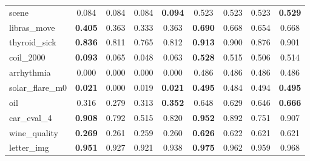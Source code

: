 \begin{figure}[ht]
\begin{tabular}{p{22mm}|*4{p{14mm}}|*4{p{14mm}}}
        scene&\multicolumn{1}{c}{0.084}&\multicolumn{1}{c}{0.084}&\multicolumn{1}{c}{0.084}&\multicolumn{1}{c|}{\textbf{0.094}}&\multicolumn{1}{c}{0.523}&\multicolumn{1}{c}{0.523}&\multicolumn{1}{c}{0.523}&\multicolumn{1}{c}{\textbf{0.529}}\\
        libras\_move&\multicolumn{1}{c}{\textbf{0.405}}&\multicolumn{1}{c}{0.363}&\multicolumn{1}{c}{0.333}&\multicolumn{1}{c|}{0.363}&\multicolumn{1}{c}{\textbf{0.690}}&\multicolumn{1}{c}{0.668}&\multicolumn{1}{c}{0.654}&\multicolumn{1}{c}{0.668}\\
        thyroid\_sick&\multicolumn{1}{c}{\textbf{0.836}}&\multicolumn{1}{c}{0.811}&\multicolumn{1}{c}{0.765}&\multicolumn{1}{c|}{0.812}&\multicolumn{1}{c}{\textbf{0.913}}&\multicolumn{1}{c}{0.900}&\multicolumn{1}{c}{0.876}&\multicolumn{1}{c}{0.901}\\
        coil\_2000&\multicolumn{1}{c}{\textbf{0.093}}&\multicolumn{1}{c}{0.065}&\multicolumn{1}{c}{0.048}&\multicolumn{1}{c|}{0.063}&\multicolumn{1}{c}{\textbf{0.528}}&\multicolumn{1}{c}{0.515}&\multicolumn{1}{c}{0.506}&\multicolumn{1}{c}{0.514}\\
        arrhythmia&\multicolumn{1}{c}{0.000}&\multicolumn{1}{c}{0.000}&\multicolumn{1}{c}{0.000}&\multicolumn{1}{c|}{0.000}&\multicolumn{1}{c}{0.486}&\multicolumn{1}{c}{0.486}&\multicolumn{1}{c}{0.486}&\multicolumn{1}{c}{0.486}\\
        solar\_flare\_m0&\multicolumn{1}{c}{\textbf{0.021}}&\multicolumn{1}{c}{0.000}&\multicolumn{1}{c}{0.019}&\multicolumn{1}{c|}{\textbf{0.021}}&\multicolumn{1}{c}{\textbf{0.495}}&\multicolumn{1}{c}{0.484}&\multicolumn{1}{c}{0.494}&\multicolumn{1}{c}{\textbf{0.495}}\\
        oil&\multicolumn{1}{c}{0.316}&\multicolumn{1}{c}{0.279}&\multicolumn{1}{c}{0.313}&\multicolumn{1}{c|}{\textbf{0.352}}&\multicolumn{1}{c}{0.648}&\multicolumn{1}{c}{0.629}&\multicolumn{1}{c}{0.646}&\multicolumn{1}{c}{\textbf{0.666}}\\
        car\_eval\_4&\multicolumn{1}{c}{\textbf{0.908}}&\multicolumn{1}{c}{0.792}&\multicolumn{1}{c}{0.515}&\multicolumn{1}{c|}{0.820}&\multicolumn{1}{c}{\textbf{0.952}}&\multicolumn{1}{c}{0.892}&\multicolumn{1}{c}{0.751}&\multicolumn{1}{c}{0.907}\\
        wine\_quality&\multicolumn{1}{c}{\textbf{0.269}}&\multicolumn{1}{c}{0.261}&\multicolumn{1}{c}{0.259}&\multicolumn{1}{c|}{0.260}&\multicolumn{1}{c}{\textbf{0.626}}&\multicolumn{1}{c}{0.622}&\multicolumn{1}{c}{0.621}&\multicolumn{1}{c}{0.621}\\
        letter\_img&\multicolumn{1}{c}{\textbf{0.951}}&\multicolumn{1}{c}{0.927}&\multicolumn{1}{c}{0.921}&\multicolumn{1}{c|}{0.938}&\multicolumn{1}{c}{\textbf{0.975}}&\multicolumn{1}{c}{0.962}&\multicolumn{1}{c}{0.959}&\multicolumn{1}{c}{0.968}\\

\end{tabular}
\end{figure}
